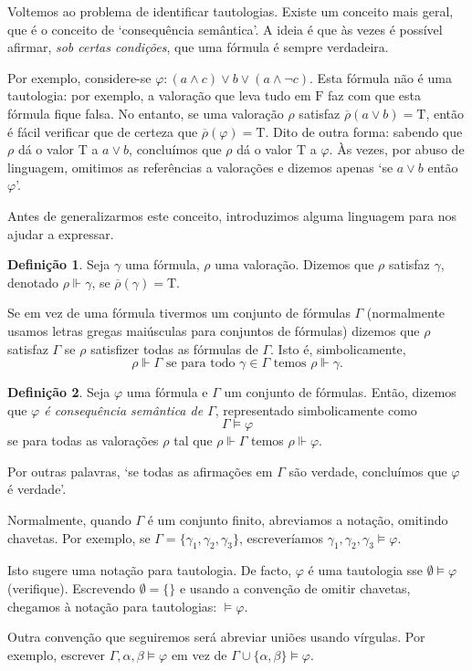\documentclass{report}
\theoremstyle{definition}
\newtheorem*{definicao*}{Definição}
\theoremstyle{remark}
\newcommand{\lt}{\mathrm{T}}
\newcommand{\lf}{\mathrm{F}}
\begin{document}
	Voltemos ao problema de identificar tautologias. Existe um conceito mais geral, que é o conceito de `consequência semântica'. A ideia é que às vezes é possível afirmar, \emph{sob certas condições}, que uma fórmula é sempre verdadeira.
	
	Por exemplo, considere-se $\varphi : (a \land c) \lor b \lor (a \land \neg c)$. Esta fórmula não é uma tautologia: por exemplo, a valoração que leva tudo em $\lf$ faz com que esta fórmula fique falsa. No entanto, se uma valoração $\rho$ satisfaz $\overline\rho(a \lor b) = \lt$, então é fácil verificar que de certeza que $\overline\rho(\varphi) = \lt$. Dito de outra forma: sabendo que $\rho$ dá o valor $\lt$ a $a \lor b$, concluímos que $\rho$ dá o valor $\lt$ a $\varphi$. Às vezes, por abuso de linguagem, omitimos as referências a valorações e dizemos apenas `se $a \lor b$ então $\varphi$'.
	
	Antes de generalizarmos este conceito, introduzimos alguma linguagem para nos ajudar a expressar.
	
	\begin{definicao*}
	Seja $\gamma$ uma fórmula, $\rho$ uma valoração. Dizemos que $\rho$ satisfaz $\gamma$, denotado $\rho \Vdash \gamma$, se $\overline\rho(\gamma) = \lt$.
	
	Se em vez de uma fórmula tivermos um conjunto de fórmulas $\Gamma$ (normalmente usamos letras gregas maiúsculas para conjuntos de fórmulas) dizemos que $\rho$ satisfaz $\Gamma$ se $\rho$ satisfizer todas as fórmulas de $\Gamma$. Isto é, simbolicamente,
	\[\rho \Vdash \Gamma \text{ se para todo $\gamma \in \Gamma$ temos } \rho \Vdash \gamma.\]
	\end{definicao*}
	
	\begin{definicao*}
	Seja $\varphi$ uma fórmula e $\Gamma$ um conjunto de fórmulas. Então, dizemos que \emph{$\varphi$ é consequência semântica de $\Gamma$}, representado simbolicamente como
	\[\Gamma \vDash \varphi\]
	se para todas as valorações $\rho$ tal que $\rho \Vdash \Gamma$ temos $\rho \Vdash \varphi$.
	
	Por outras palavras, `se todas as afirmações em $\Gamma$ são verdade, concluímos que $\varphi$ é verdade'.
	
	Normalmente, quando $\Gamma$ é um conjunto finito, abreviamos a notação, omitindo chavetas. Por exemplo, se $\Gamma = \{\gamma_1, \gamma_2, \gamma_3\}$, escreveríamos $\gamma_1, \gamma_2, \gamma_3 \vDash \varphi$.
	
	Isto sugere uma notação para tautologia. De facto, $\varphi$ é uma tautologia sse $\emptyset \vDash \varphi$ (verifique). Escrevendo $\emptyset = \{\}$ e usando a convenção de omitir chavetas, chegamos à notação para tautologias: $\vDash \varphi$.
	
	Outra convenção que seguiremos será abreviar uniões usando vírgulas. Por exemplo, escrever $\Gamma, \alpha, \beta \vDash \varphi$ em vez de $\Gamma \cup \{\alpha, \beta\} \vDash \varphi$.
	\end{definicao*}
	
\end{document}
